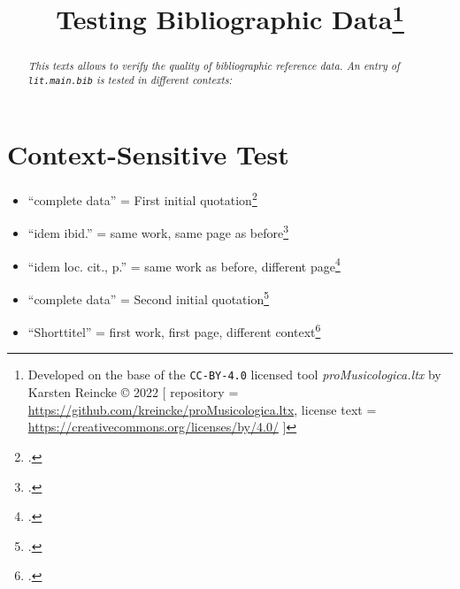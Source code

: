 \documentclass[
  DIV=calc,
  BCOR=5mm,
  11pt,
  headings=small,
  oneside,
  abstract=true,
  toc=bib,
  ngerman,english]{scrartcl}
\begin{document}
\nocite{*}

\titlehead{Bib\LaTeX}
\subject{Release 1.0}
\title{Testing Bibliographic Data\footnote{
Developed on the base of the \texttt{CC-BY-4.0} licensed tool \textit{proMusicologica.ltx} by Karsten Reincke \copyright{} 2022 [
repository = \href{https://github.com/kreincke/proMusicologica.ltx}{https://github.com/kreincke/proMusicologica.ltx},
license text = \href{https://creativecommons.org/licenses/by/4.0/}{https://creativecommons.org/licenses/by/4.0/} ]}
}

\maketitle
\begin{abstract}
\noindent \itshape
This texts allows to verify the quality of bibliographic reference data. An entry of \texttt{lit.main.bib} is tested in different contexts:
\end{abstract}



\section{Context-Sensitive Test}
\begin{itemize}
  \item \enquote{complete data} = First initial quotation\footcite[vgl.][123]{Grabner1974a}
  \item \enquote{idem ibid.} = same work, same page as before\footcite[cf.][123]{Grabner1974a}
  \item \enquote{idem loc. cit., p.} = same work as before, different page\footcite[cf.][125f]{Grabner1974a}
  \item \enquote{complete data} = Second initial quotation\footcite[vgl.][123]{Delamotte2011a}
  \item \enquote{Shorttitel} = first work, first page, different context\footcite[cf.][123]{Grabner1974a}
\end{itemize}



\printnomenclature
\printbibliography
\end{document}

